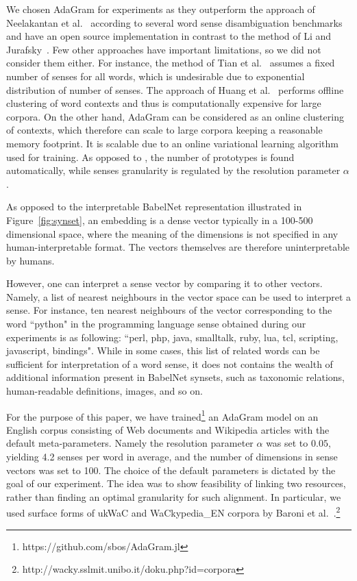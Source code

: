 \documentclass[10pt, a4paper]{article}
\begin{document}
We chosen AdaGram for experiments as they outperform the approach of Neelakantan et al.~ according to several word sense disambiguation benchmarks and have an open source implementation in contrast to the method of Li and Jurafsky~. Few other approaches have important limitations, so we did not consider them either. For instance, the method of Tian et al.~ assumes a fixed number of senses for all words, which is undesirable due to exponential distribution of number of senses. The approach of Huang et al.~ performs offline clustering of word contexts and thus is computationally expensive for large corpora. On the other hand, AdaGram can be considered as an online clustering of contexts, which therefore can scale to large corpora keeping a reasonable memory footprint. It is scalable due to an online variational learning algorithm used for training. As opposed to \cite{tianEtAl2014}, the number of prototypes is found automatically, while senses granularity is regulated by the resolution parameter $\alpha$.  

As opposed to the interpretable BabelNet representation illustrated in Figure~\ref{fig:synset}, an embedding is a dense vector typically in a 100-500 dimensional space, where the meaning of the dimensions is not specified in any human-interpretable format. The vectors themselves are therefore uninterpretable by humans. 

However, one can interpret a sense vector by comparing it to other vectors. Namely, a list of nearest neighbours in the vector space can be used to interpret a sense. For instance, ten nearest neighbours of the vector corresponding to the word ``python" in the programming language sense obtained during our experiments is as following: ``perl, php, java, smalltalk, ruby, lua, tcl, scripting, javascript, bindings". While in some cases, this list of related words can be sufficient for interpretation of a word sense, it does not contains the wealth of additional information present in BabelNet synsets, such as taxonomic relations, human-readable definitions, images, and so on.   

 
 

For the purpose of this paper, we have trained\footnote{https://github.com/sbos/AdaGram.jl} an AdaGram model on an English corpus consisting of Web documents and Wikipedia articles with the default meta-parameters. Namely the resolution parameter $\alpha$ was set to $0.05$,  yielding 4.2 senses per word in average, and the number of dimensions in sense vectors was set to 100. The choice of the default parameters is dictated by the goal of our experiment. The idea was to show feasibility of linking  two resources, rather than finding an optimal granularity for such alignment. In particular, we used surface forms of ukWaC and WaCkypedia\_EN corpora by Baroni et al.~.\footnote{http://wacky.sslmit.unibo.it/doku.php?id=corpora}
\end{document}
